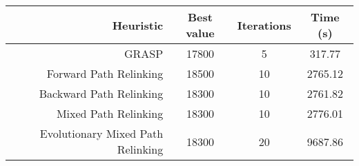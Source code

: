 \begin{center}
	\begin{tabular}{r|c|c|c}
		Heuristic							& Best value	& Iterations	& Time (s)	\\
		\hline
		GRASP 								& 17800			& 5				& 317.77	\\
		Forward Path Relinking				& 18500 		& 10 			& 2765.12	\\
		Backward Path Relinking				& 18300			& 10  			& 2761.82	\\
		Mixed Path Relinking 				& 18300			& 10	 		& 2776.01	\\
		Evolutionary Mixed Path Relinking	& 18300			& 20			& 9687.86	\\
	\end{tabular}
\end{center}
